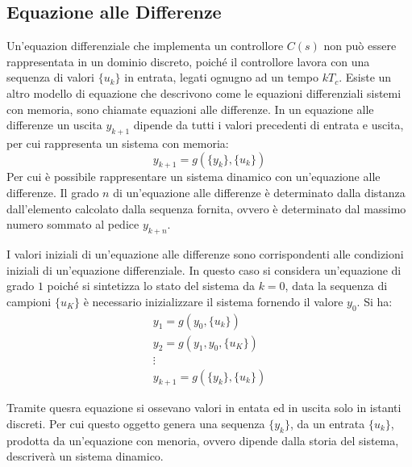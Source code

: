 \documentclass{article}
\numberwithin{equation}{subsection}
\begin{document}
\subsection{Equazione alle Differenze}

Un'equazion differenziale che implementa un controllore $C(s)$ non può essere rappresentata in un dominio discreto, poiché il controllore lavora con una sequenza di valori 
$\{u_k\}$ in entrata, legati ognugno ad un tempo $kT_c$. Esiste un altro modello di equazione che descrivono come le equazioni differenziali sistemi con memoria, sono chiamate 
equazioni alle differenze. In un equazione alle differenze un uscita $y_{k+1}$ dipende da tutti i valori precedenti di entrata e uscita, per cui rappresenta un sistema con 
memoria: 
\begin{equation}
    y_{k+1}=g\left(\{y_k\},\{u_k\}\right)
\end{equation}
Per cui è possibile rappresentare un sistema dinamico con un'equazione alle differenze. Il grado $n$ di un'equazione alle differenze è determinato dalla distanza dall'elemento 
calcolato dalla sequenza fornita, ovvero è determinato dal massimo numero sommato al pedice $y_{k+n}$. 

I valori iniziali di un'equazione alle differenze sono corrispondenti alle condizioni iniziali di un'equazione differenziale. In questo caso si considera un'equazione di grado 
$1$ poiché si sintetizza lo stato del sistema da $k=0$, data la sequenza di campioni $\{u_K\}$ è necessario inizializzare il sistema fornendo il valore $y_0$. 
Si ha:
\begin{gather}
    y_1=g(y_0,\{u_k\})\\
    y_2=g(y_1,y_0,\{u_K\})\\
    \vdots\\
    y_{k+1}=g(\{y_k\},\{u_k\})
\end{gather}

Tramite 
quesra equazione si ossevano valori in entata ed in uscita solo in istanti discreti. Per cui questo oggetto genera una sequenza $\{y_k\}$, da un entrata $\{u_k\}$, prodotta 
da un'equazione con menoria, ovvero dipende dalla storia del sistema, descriverà un sistema dinamico. 

\begin{center}\end{center}
\end{document}
